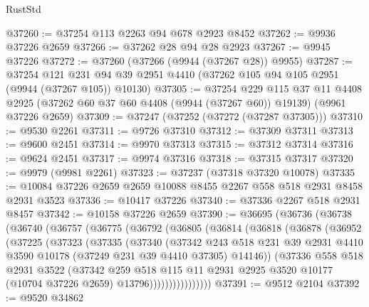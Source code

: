 \begin{lexlean}{RustStd}
\begin{coremodule}
@37260 := @37254 @113 @2263 @94 @678 @2923 @8452
@37262 := @9936 @37226 @2659
@37266 := @37262 @28 @94 @28 @2923
@37267 := @9945 @37226
@37272 := @37260 (@37266 (@9944 (@37267 @28)) @9955)
@37287 := @37254
    @121
    @231
    @94
    @39
    @2951
    @4410
    (@37262 @105 @94 @105 @2951 (@9944 (@37267 @105)) @10130)
@37305 := @37254
    @229
    @115
    @37
    @11
    @4408
    @2925
    (@37262 @60 @37 @60 @4408 (@9944 (@37267 @60)) @19139)
    (@9961 @37226 @2659)
@37309 := @37247 (@37252 (@37272 (@37287 @37305)))
@37310 := @9530 @2261
@37311 := @9726 @37310
@37312 := @37309 @37311
@37313 := @9600 @2451
@37314 := @9970 @37313
@37315 := @37312 @37314
@37316 := @9624 @2451
@37317 := @9974 @37316
@37318 := @37315 @37317
@37320 := @9979 (@9981 @2261)
@37323 := @37237 (@37318 @37320 @10078)
@37335 := @10084 @37226 @2659 @2659 @10088 @8455 @2267 @558 @518 @2931 @8458 @2931 @3523
@37336 := @10417 @37226
@37340 := @37336 @2267 @518 @2931 @8457
@37342 := @10158 @37226 @2659
@37390 := @36695
    (@36736
      (@36738
        (@36740
          (@36757
            (@36775
              (@36792
                (@36805
                  (@36814
                    (@36818
                      (@36878
                        (@36952
                          (@37225
                            (@37323
                              (@37335
                                (@37340
                                  (@37342
                                    @243
                                    @518
                                    @231
                                    @39
                                    @2931
                                    @4410
                                    @3590
                                    @10178
                                    (@37249 @231 @39 @4410 @37305)
                                    @14146))
                                (@37336
                                  @558
                                  @518
                                  @2931
                                  @3522
                                  (@37342
                                    @259
                                    @518
                                    @115
                                    @11
                                    @2931
                                    @2925
                                    @3520
                                    @10177
                                    (@10704 @37226 @2659)
                                    @13796))))))))))))))))
@37391 := @9512 @2104
@37392 := @9520 @34862

\end{coremodule}
\end{lexlean}
